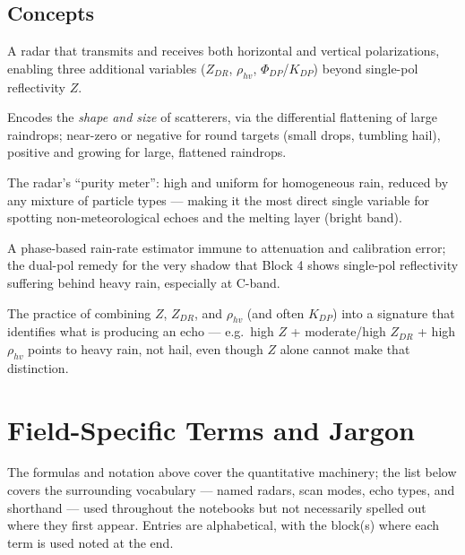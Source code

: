 \documentclass[11pt]{article}
\begin{document}
\subsection{Concepts}
\begin{description}[leftmargin=1.6cm,style=nextline]
\item[Dual-polarization radar] A radar that transmits and receives both horizontal and vertical polarizations, enabling three additional variables ($Z_{DR}$, $\rho_{hv}$, $\Phi_{DP}$/$K_{DP}$) beyond single-pol reflectivity $Z$.
\item[Differential reflectivity ($Z_{DR}$)] Encodes the \emph{shape and size} of scatterers, via the differential flattening of large raindrops; near-zero or negative for round targets (small drops, tumbling hail), positive and growing for large, flattened raindrops.
\item[Correlation coefficient ($\rho_{hv}$)] The radar's ``purity meter'': high and uniform for homogeneous rain, reduced by any mixture of particle types --- making it the most direct single variable for spotting non-meteorological echoes and the melting layer (bright band).
\item[Specific differential phase ($K_{DP}$)] A phase-based rain-rate estimator immune to attenuation and calibration error; the dual-pol remedy for the very shadow that Block 4 shows single-pol reflectivity suffering behind heavy rain, especially at C-band.
\item[Hydrometeor classification] The practice of combining $Z$, $Z_{DR}$, and $\rho_{hv}$ (and often $K_{DP}$) into a signature that identifies what is producing an echo --- e.g.\ high $Z$ + moderate/high $Z_{DR}$ + high $\rho_{hv}$ points to heavy rain, not hail, even though $Z$ alone cannot make that distinction.
\end{description}

\newpage
\section{Field-Specific Terms and Jargon}

The formulas and notation above cover the quantitative machinery; the list below covers the surrounding vocabulary --- named radars, scan modes, echo types, and shorthand --- used throughout the notebooks but not necessarily spelled out where they first appear. Entries are alphabetical, with the block(s) where each term is used noted at the end.
\end{document}
